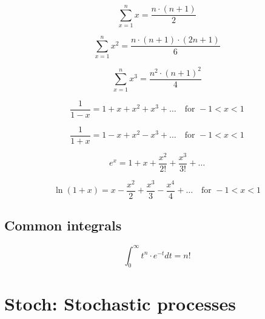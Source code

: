 \documentclass[12pt]{report}
\renewcommand{\_}{\kern-1.5pt\textunderscore\kern-1.5pt}
\begin{document}
 \[  \]  \[  \sum _{x=1}^{n}x=\frac{n \cdot  \left( n+1 \right) }{2} \] \par

 \[  \]  \[  \sum _{x=1}^{n}x^{2}=\frac{n \cdot  \left( n+1 \right)  \cdot  \left( 2n+1 \right) }{6} \] \par

 \[  \]  \[  \sum _{x=1}^{n}x^{3}=\frac{n^{2} \cdot  \left( n+1 \right) ^{2}}{4} \] \par

 \[  \]  \[ \frac{1}{1-x}=1+x+x^{2}+x^{3}+ \ldots \mathrm{\text{~~ for }}-1<x<1 \] \par

 \[  \]  \[ \frac{1}{1+x}=1-x+x^{2}-x^{3}+ \ldots \mathrm{\text{~~ for }}-1<x<1 \] \par

 \[  \]  \[ e^{x}=1+x+\frac{x^{2}}{2!}+\frac{x^{3}}{3!}+ \ldots  \] \par

 \[  \]  \[ \ln  \left( 1+x \right) =x-\frac{x^{2}}{2}+\frac{x^{3}}{3}-\frac{x^{4}}{4}+ \ldots \mathrm{\text{~~ for }}-1<x<1 \] \par

\subsection*{Common integrals}
 \[  \]  \[  \int _{0}^{\infty}t^{n} \cdot e^{-t}dt=n! \] \par


\vspace{\baselineskip}

\vspace{\baselineskip}



\newpage

\vspace{\baselineskip}\section*{Stoch: Stochastic processes}
\end{document}
